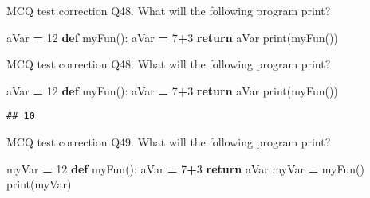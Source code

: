 \documentclass[
  8pt,
  ignorenonframetext,
]{beamer}
\newenvironment{Shaded}{\begin{snugshade}}{\end{snugshade}}
\newcommand{\BuiltInTok}[1]{#1}
\newcommand{\ControlFlowTok}[1]{\textcolor[rgb]{0.13,0.29,0.53}{\textbf{#1}}}
\newcommand{\DecValTok}[1]{\textcolor[rgb]{0.00,0.00,0.81}{#1}}
\newcommand{\KeywordTok}[1]{\textcolor[rgb]{0.13,0.29,0.53}{\textbf{#1}}}
\newcommand{\NormalTok}[1]{#1}
\newcommand{\OperatorTok}[1]{\textcolor[rgb]{0.81,0.36,0.00}{\textbf{#1}}}
\begin{document}
\begin{frame}[fragile]{MCQ test correction}
\protect\hypertarget{mcq-test-correction-94}{}
Q48. What will the following program print?

\begin{Shaded}
\begin{Highlighting}[]
\NormalTok{aVar }\OperatorTok{=} \DecValTok{12}
\KeywordTok{def}\NormalTok{ myFun():}
\NormalTok{    aVar }\OperatorTok{=} \DecValTok{7}\OperatorTok{+}\DecValTok{3}
    \ControlFlowTok{return}\NormalTok{ aVar}
\BuiltInTok{print}\NormalTok{(myFun())}
\end{Highlighting}
\end{Shaded}
\end{frame}

\begin{frame}[fragile]{MCQ test correction}
\protect\hypertarget{mcq-test-correction-95}{}
Q48. What will the following program print?

\begin{Shaded}
\begin{Highlighting}[]
\NormalTok{aVar }\OperatorTok{=} \DecValTok{12}
\KeywordTok{def}\NormalTok{ myFun():}
\NormalTok{    aVar }\OperatorTok{=} \DecValTok{7}\OperatorTok{+}\DecValTok{3}
    \ControlFlowTok{return}\NormalTok{ aVar}
\BuiltInTok{print}\NormalTok{(myFun())}
\end{Highlighting}
\end{Shaded}

\begin{verbatim}
## 10
\end{verbatim}
\end{frame}

\begin{frame}[fragile]{MCQ test correction}
\protect\hypertarget{mcq-test-correction-96}{}
Q49. What will the following program print?

\begin{Shaded}
\begin{Highlighting}[]
\NormalTok{myVar }\OperatorTok{=} \DecValTok{12}
\KeywordTok{def}\NormalTok{ myFun():}
\NormalTok{    aVar }\OperatorTok{=} \DecValTok{7}\OperatorTok{+}\DecValTok{3}
    \ControlFlowTok{return}\NormalTok{ aVar}
\NormalTok{myVar }\OperatorTok{=}\NormalTok{ myFun()}
\BuiltInTok{print}\NormalTok{(myVar)}
\end{Highlighting}
\end{Shaded}
\end{frame}
\end{document}
